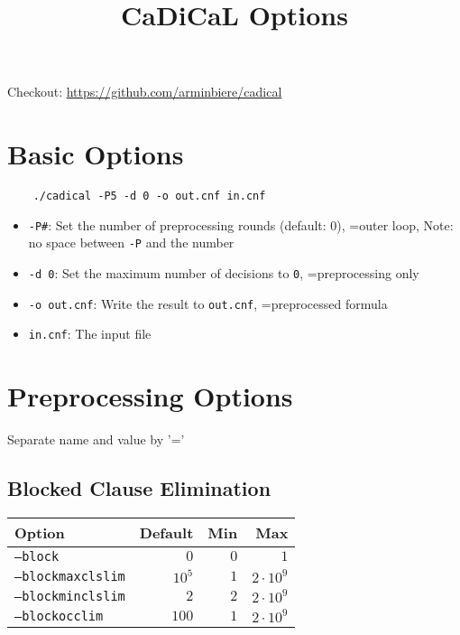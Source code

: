 \documentclass{article}
\begin{document}
\title{CaDiCaL Options}
\date{}

\maketitle

Checkout: \url{https://github.com/arminbiere/cadical}

\section{Basic Options}

\begin{verbatim}
    ./cadical -P5 -d 0 -o out.cnf in.cnf
\end{verbatim}

\begin{itemize}
    \item \texttt{-P\#}: Set the number of preprocessing rounds (default: 0), =outer loop, Note: no space between \texttt{-P} and the number
    \item \texttt{-d 0}: Set the maximum number of decisions to \texttt{0}, =preprocessing only
    \item \texttt{-o out.cnf}: Write the result to \texttt{out.cnf}, =preprocessed formula
    \item \texttt{in.cnf}: The input file
\end{itemize}

\section{Preprocessing Options}

Separate name and value by '='

\subsection{Blocked Clause Elimination}
\begin{tabular}{l|rrr}
    Option & Default & Min & Max \\
    \hline
    \texttt{--block}          & $0$    & $0$  & $1$ \\
    \texttt{--blockmaxclslim} & $10^5$ & $1$  & $2 \cdot 10^9$ \\
    \texttt{--blockminclslim} & $2$    & $2$  & $2 \cdot 10^9$ \\
    \texttt{--blockocclim}    & $100$  & $1$  & $2 \cdot 10^9$ \\    
\end{tabular}
\end{document}
